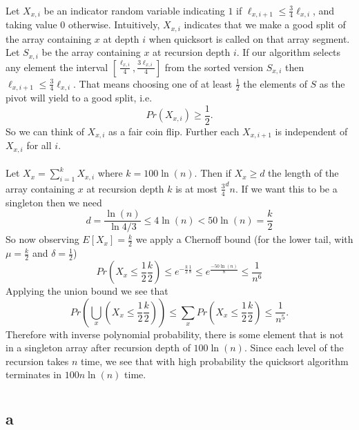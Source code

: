 \documentclass[letterpaper,12pt,oneside,onecolumn]{article}
\begin{document}
\paragraph{}
Let $X_{x,i}$ be an indicator random variable indicating $1$ if $\ell_{x,i+1} \leq \frac{3}{4}\ell_{x,i}$, and taking value $0$ otherwise. Intuitively, $X_{x,i}$ indicates that we make a good split of the array containing $x$ at depth $i$ when quicksort is called on that array segment. Let $S_{x,i}$ be the array containing $x$ at recursion depth $i$. If our algorithm selects any element the interval $[\frac{\ell_{x,i}}{4}, \frac{3\ell_{x,i}}{4}]$ from the sorted version $S_{x,i}$ then $\ell_{x,i+1} \leq \frac{3}{4}\ell_{x,i}$. That means choosing one of at least $\frac{1}{2}$ the elements of $S$ as the pivot will yield to a good split, i.e.
$$Pr(X_{x,i}) \geq \frac{1}{2}.$$
So we can think of $X_{x,i}$ as a fair coin flip. Further each $X_{x,i+1}$ is independent of $X_{x,i}$ for all $i$.
\paragraph{}
Let $X_{x} = \sum_{i=1}^{k} X_{x,i}$ where $k=100\ln(n)$. Then if $X_{x} \geq d$ the length of the array containing $x$ at recursion depth $k$ is at most $\frac{3}{4}^d n$. If we want this to be a singleton then we need $$d = \frac{\ln(n)}{\ln{4/3}} \leq 4\ln(n) < 50\ln(n) = \frac{k}{2}$$
So now observing $E[X_{x}] =\frac{k}{2}$ we apply a Chernoff bound (for the lower tail, with $\mu = \frac{k}{2}$ and $\delta = \frac{1}{2}$)
$$Pr(X_{x} \leq \frac{1}{2}\frac{k}{2}) \leq e^{-\frac{k}{2}\frac{1}{8}} \leq e^{\frac{-50\ln(n)}{8}} \leq \frac{1}{n^6}$$
Applying the union bound we see that
$$Pr(\bigcup_x(X_{x} \leq \frac{1}{2}\frac{k}{2})) \leq \sum_{x} Pr(X_{x} \leq \frac{1}{2}\frac{k}{2})  \leq \frac{1}{n^5}.$$
Therefore with inverse polynomial probability, there is some element that is not in a singleton array after recursion depth of $100 \ln(n)$. Since each level of the recursion takes $n$ time, we see that with high probability the quicksort algorithm terminates in $100n\ln(n)$ time.

\newpage
\section{}
\subsection{a}
\end{document}
